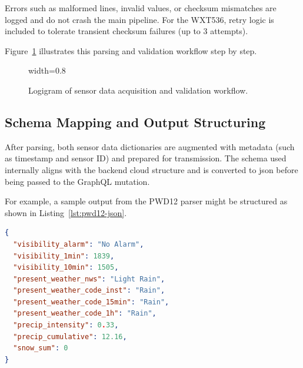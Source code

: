 Errors such as malformed lines, invalid values, or checksum mismatches are logged and do not crash the main pipeline. For the WXT536, retry logic is included to tolerate transient checksum failures (up to 3 attempts).

Figure~\ref{fig:flow-acquisition} illustrates this parsing and validation workflow step by step.

\begin{figure}[H]
\centering
\begin{adjustbox}{width=0.8\textwidth}
\end{adjustbox}
\caption{Logigram of sensor data acquisition and validation workflow.}
\label{fig:flow-acquisition}
\end{figure}

\subsection{Schema Mapping and Output Structuring}

After parsing, both sensor data dictionaries are augmented with metadata (such as timestamp and sensor ID) and prepared for transmission. The schema used internally aligns with the backend cloud structure and is converted to \gls{json} before being passed to the GraphQL mutation.

For example, a sample output from the PWD12 parser might be structured as shown in Listing~\ref{lst:pwd12-json}.
{\small
\begin{lstlisting}[language=json, caption={Parsed JSON structure from a PWD12 message}, label={lst:pwd12-json}]
{
  "visibility_alarm": "No Alarm",
  "visibility_1min": 1839,
  "visibility_10min": 1505,
  "present_weather_nws": "Light Rain",
  "present_weather_code_inst": "Rain",
  "present_weather_code_15min": "Rain",
  "present_weather_code_1h": "Rain",
  "precip_intensity": 0.33,
  "precip_cumulative": 12.16,
  "snow_sum": 0
}
\end{lstlisting}

}

